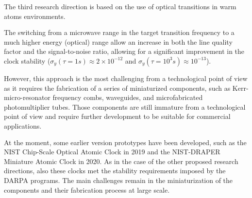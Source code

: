 The third research direction is based on the use of optical transitions in warm atoms environments.

The switching from a microwave range in the target transition frequency to a much higher energy (optical) range allow an increase in both the line quality factor and the signal-to-noise ratio, allowing for a significant improvement in the clock stability ($\sigma_y(\tau=1s) \approx 2 \times 10^{-12}$ and $\sigma_y(\tau=10^3s) \approx 10^{-13}$).

However, this approach is the most challenging from a technological point of view as it requires the fabrication of a series of miniaturized components, such as Kerr-micro-resonator frequency combs, waveguides, and microfabricated photomultiplier tubes.
Those components are still immature from a technological point of view and require further development to be suitable for commercial applications.

At the moment, some earlier version prototypes have been developed, such as the NIST Chip-Scale Optical Atomic Clock in 2019 and the NIST-DRAPER Miniature Atomic Clock in 2020.
As in the case of the other proposed research directions, also these clocks met the stability requirements imposed by the DARPA programs.
The main challenges remain in the miniaturization of the components and their fabrication process at large scale.


